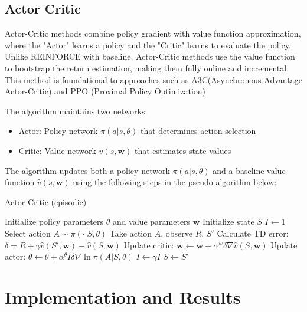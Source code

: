 \documentclass{article}
\begin{document}
\subsection{Actor Critic}

Actor-Critic methods combine policy gradient with value function approximation, where the "Actor" learns a policy and the "Critic" learns to evaluate the policy. Unlike REINFORCE with baseline, Actor-Critic methods use the value function to bootstrap the return estimation, making them fully online and incremental. This method is foundational to approaches such as A3C(Asynchronous Advantage Actor-Critic) and PPO (Proximal Policy Optimization) 

The algorithm maintains two networks:
\begin{itemize}
    \item Actor: Policy network $\pi(a|s,\theta)$ that determines action selection
    \item Critic: Value network $\hat{v}(s,\mathbf{w})$ that estimates state values
\end{itemize}

The algorithm updates both a policy network $\pi(a|s,\theta)$ and a baseline value function $\hat{v}(s,\mathbf{w})$ using the following steps in the pseudo algorithm below:

\begin{algorithm}
\caption{Actor-Critic (episodic)}
\begin{algorithmic}[1]
\State Initialize policy parameters $\theta$ and value parameters $\mathbf{w}$
    \State Initialize state $S$
    \State $I \leftarrow 1$
        \State Select action $A \sim \pi(\cdot|S,\theta)$
        \State Take action $A$, observe $R$, $S'$
        \State Calculate TD error: $\delta = R + \gamma\hat{v}(S',\mathbf{w}) - \hat{v}(S,\mathbf{w})$
        \State Update critic: $\mathbf{w} \leftarrow \mathbf{w} + \alpha^w \delta \nabla \hat{v}(S,\mathbf{w})$
        \State Update actor: $\theta \leftarrow \theta + \alpha^\theta I \delta \nabla \ln \pi(A|S,\theta)$
        \State $I \leftarrow \gamma I$
        \State $S \leftarrow S'$
\EndFor
\end{algorithmic}
\end{algorithm}

\section{Implementation and Results}
\end{document}
